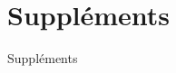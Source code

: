 \section*{Suppléments}
  \begin{frame}[allowframebreaks]{Suppléments}
    \framesubtitle{}
  \end{frame}

